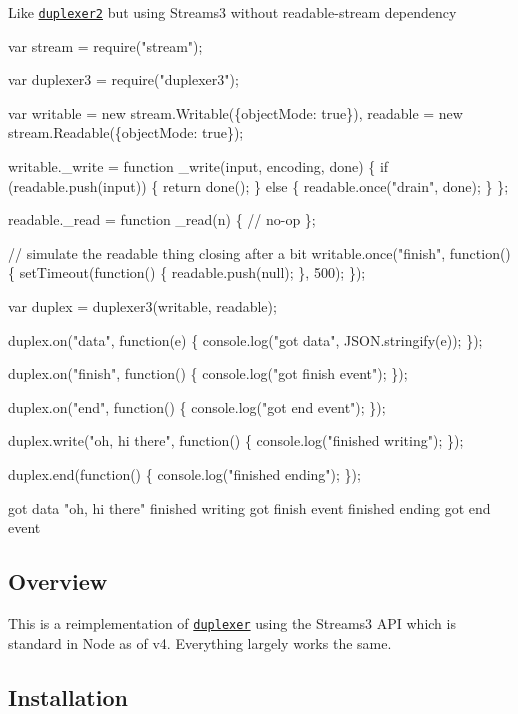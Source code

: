 Like \href{https://github.com/deoxxa/duplexer2}{\tt duplexer2} but using Streams3 without readable-\/stream dependency


\begin{DoxyCode}
var stream = require("stream");

var duplexer3 = require("duplexer3");

var writable = new stream.Writable(\{objectMode: true\}),
    readable = new stream.Readable(\{objectMode: true\});

writable.\_write = function \_write(input, encoding, done) \{
  if (readable.push(input)) \{
    return done();
  \} else \{
    readable.once("drain", done);
  \}
\};

readable.\_read = function \_read(n) \{
  // no-op
\};

// simulate the readable thing closing after a bit
writable.once("finish", function() \{
  setTimeout(function() \{
    readable.push(null);
  \}, 500);
\});

var duplex = duplexer3(writable, readable);

duplex.on("data", function(e) \{
  console.log("got data", JSON.stringify(e));
\});

duplex.on("finish", function() \{
  console.log("got finish event");
\});

duplex.on("end", function() \{
  console.log("got end event");
\});

duplex.write("oh, hi there", function() \{
  console.log("finished writing");
\});

duplex.end(function() \{
  console.log("finished ending");
\});
\end{DoxyCode}



\begin{DoxyCode}
got data "oh, hi there"
finished writing
got finish event
finished ending
got end event
\end{DoxyCode}


\subsection*{Overview}

This is a reimplementation of \href{https://www.npmjs.com/package/duplexer}{\tt duplexer} using the Streams3 A\+PI which is standard in Node as of v4. Everything largely works the same.

\subsection*{Installation}

